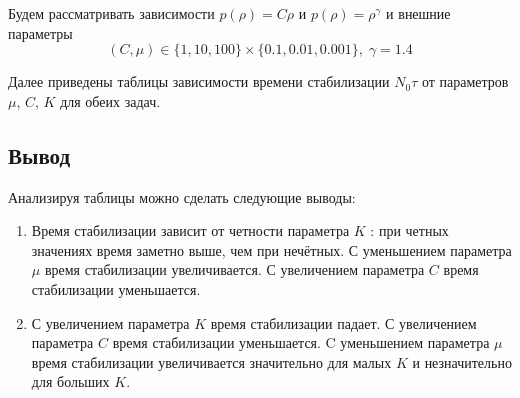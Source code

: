 Будем рассматривать зависимости 
$ p(\rho) = C \rho $ и $p(\rho) = \rho^{\gamma}$
и внешние параметры 
$$ (C, \mu) \in \{1, 10, 100\} \times \{0.1, 0.01, 0.001\}, \; \gamma = 1.4$$

Далее приведены таблицы зависимости времени стабилизации $N_0 \tau$ от параметров $\mu$, $C$, $K$ для обеих задач.



\subsection{Вывод}
Анализируя таблицы можно сделать следующие выводы:
\begin{enumerate}
  \item Время стабилизации зависит от четности параметра $K$ : при четных значениях время заметно выше, чем при нечётных. 
С уменьшением параметра $\mu$ время стабилизации увеличивается. 
С увеличением параметра $C$   время стабилизации уменьшается. 
\item С увеличением параметра $K$ время стабилизации падает. 
С увеличением параметра $C$ время стабилизации уменьшается. 
C уменьшением параметра $\mu$  время стабилизации увеличивается значительно для малых $K$ и незначительно для больших $K$.
\end{enumerate}




